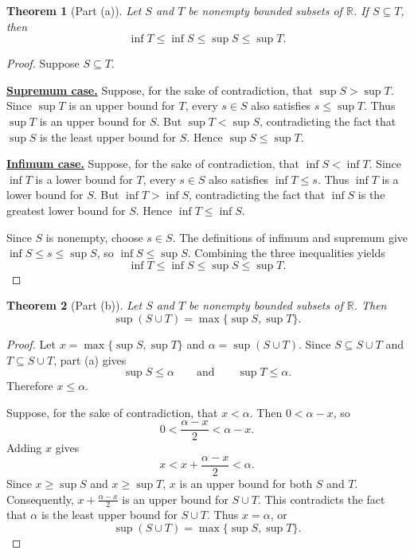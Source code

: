 \documentclass{article}
\newtheorem{theorem}{Theorem}
\theoremstyle{definition}
\begin{document}
\begin{theorem}[Part (a)]\label{thm:subset-bounds}
Let \(S\) and \(T\) be nonempty bounded subsets of \(\mathbb{R}\).
If \(S\subseteq T\), then
\[
\inf T\leq\inf S\leq\sup S\leq\sup T.
\]
\end{theorem}

\begin{proof}
Suppose \(S\subseteq T\).

\noindent\underline{\textbf{Supremum case.}}
Suppose, for the sake of contradiction, that \(\sup S>\sup T\).
Since \(\sup T\) is an upper bound for \(T\), every \(s\in S\) also satisfies \(s\leq\sup T\).
Thus \(\sup T\) is an upper bound for \(S\).
But \(\sup T<\sup S\), contradicting the fact that \(\sup S\) is the least upper bound for \(S\).
Hence \(\sup S\leq\sup T\).

\noindent\underline{\textbf{Infimum case.}}
Suppose, for the sake of contradiction, that \(\inf S<\inf T\).
Since \(\inf T\) is a lower bound for \(T\), every \(s\in S\) also satisfies \(\inf T\leq s\).
Thus \(\inf T\) is a lower bound for \(S\).
But \(\inf T>\inf S\), contradicting the fact that \(\inf S\) is the greatest lower bound for \(S\).
Hence \(\inf T\leq\inf S\).

Since \(S\) is nonempty, choose \(s\in S\).
The definitions of infimum and supremum give \(\inf S\leq s\leq\sup S\), so \(\inf S\leq\sup S\).
Combining the three inequalities yields
\[
\inf T\leq\inf S\leq\sup S\leq\sup T.
\]
\end{proof}

\begin{theorem}[Part (b)]
Let \(S\) and \(T\) be nonempty bounded subsets of \(\mathbb{R}\).
Then
\[
\sup(S\cup T)=\max\{\sup S,\sup T\}.
\]
\end{theorem}

\begin{proof}
Let \(x=\max\{\sup S,\sup T\}\) and \(\alpha=\sup(S\cup T)\).
Since \(S\subseteq S\cup T\) and \(T\subseteq S\cup T\), part (a) gives
\[
\sup S\leq\alpha
\qquad\text{and}\qquad
\sup T\leq\alpha.
\]
Therefore \(x\leq\alpha\).

Suppose, for the sake of contradiction, that \(x<\alpha\).
Then \(0<\alpha-x\), so
\[
0<\frac{\alpha-x}{2}<\alpha-x.
\]
Adding \(x\) gives
\[
x<x+\frac{\alpha-x}{2}<\alpha.
\]
Since \(x\geq\sup S\) and \(x\geq\sup T\), \(x\) is an upper bound for both \(S\) and \(T\).
Consequently, \(x+\frac{\alpha-x}{2}\) is an upper bound for \(S\cup T\).
This contradicts the fact that \(\alpha\) is the least upper bound for \(S\cup T\).
Thus \(x=\alpha\), or
\[
\sup(S\cup T)=\max\{\sup S,\sup T\}.
\]
\end{proof}
\end{document}
